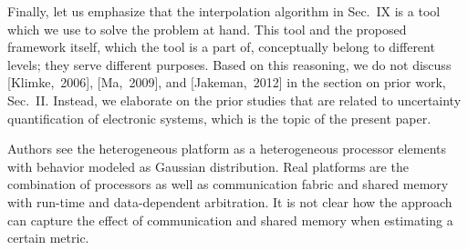 \begin{authors}
Finally, let us emphasize that the interpolation algorithm in Sec.~IX is a tool
which we use to solve the problem at hand. This tool and the proposed framework
itself, which the tool is a part of, conceptually belong to different levels;
they serve different purposes. Based on this reasoning, we do not discuss
[Klimke,~2006], [Ma,~2009], and [Jakeman,~2012] in the section on prior work,
Sec.~II. Instead, we elaborate on the prior studies that are related to
uncertainty quantification of electronic systems, which is the topic of the
present paper.

\begin{actions}

\end{actions}
\end{authors}

\begin{reviewer}
Authors see the heterogeneous platform as a heterogeneous processor elements
with behavior modeled as Gaussian distribution. Real platforms are the
combination of processors as well as communication fabric and shared memory with
run-time and data-dependent arbitration. It is not clear how the approach can
capture the effect of communication and shared memory when estimating a certain
metric.
\end{reviewer}

